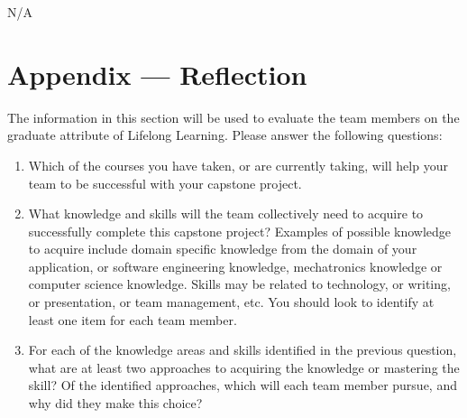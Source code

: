\documentclass[12pt, titlepage]{article}
\begin{document}
N/A

\newpage


\section{Appendix --- Reflection}

The information in this section will be used to evaluate the team members on the
graduate attribute of Lifelong Learning.  Please answer the following questions:

\begin{enumerate}
  \item Which of the courses you have taken, or are currently taking, will help
  your team to be successful with your capstone project.
  \item What knowledge and skills will the team collectively need to acquire to
  successfully complete this capstone project?  Examples of possible knowledge
  to acquire include domain specific knowledge from the domain of your
  application, or software engineering knowledge, mechatronics knowledge or
  computer science knowledge.  Skills may be related to technology, or writing,
  or presentation, or team management, etc.  You should look to identify at
  least one item for each team member.
  \item For each of the knowledge areas and skills identified in the previous
  question, what are at least two approaches to acquiring the knowledge or
  mastering the skill?  Of the identified approaches, which will each team
  member pursue, and why did they make this choice?
\end{enumerate}
\end{document}
